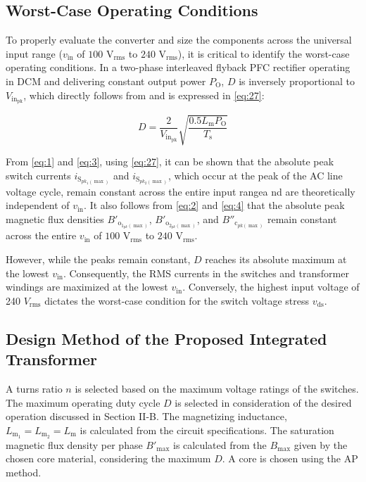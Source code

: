 \documentclass[lettersize,journal]{IEEEtran}
\begin{document}
\subsection{Worst-Case Operating Conditions}
To properly evaluate the converter and size the components across the universal input range ($v_{\text{in}}$ of $100\text{ V}_{\text{rms}}$ to $240\text{ V}_{\text{rms}}$), it is critical to identify the worst-case operating conditions. In a two-phase interleaved flyback PFC rectifier operating in DCM and delivering constant output power $P_{\text{O}}$, $D$ is inversely proportional to $V_{\text{in}_\mathrm{pk}}$, which directly follows from \cite{ref8} and is expressed in \eqref{eq:27}:

\begin{equation}
\label{eq:27}
D = \frac{2}{V_{\mathrm{in}_{\mathrm{pk}}}} \sqrt{\frac{0.5 L_{\mathrm{m}} P_{\mathrm{O}}}{T_{\mathrm{s}}}}
\end{equation}

From \eqref{eq:1} and \eqref{eq:3}, using \eqref{eq:27}, it can be shown that the absolute peak switch currents $i_{\mathrm{S}_{pk_1(\max)}}$ and $i_{\mathrm{S}_{pk_2(\max)}}$, which occur at the peak of the AC line voltage cycle, remain constant across the entire input rangea nd are theoretically independent of $v_{\mathrm{in}}$. It also follows from \eqref{eq:2} and \eqref{eq:4} that the absolute peak magnetic flux densities $B'_{\mathrm{o}_{1_{pk}(\max)}}$, $B'_{\mathrm{o}_{2_{pk}(\max)}}$, and $B''_{\mathrm{c}_{pk(\max)}}$ remain constant across the entire $v_{\text{in}}$ of $100\text{ V}_{\text{rms}}$ to $240\text{ V}_{\text{rms}}$. 

However, while the peaks remain constant, $D$ reaches its absolute maximum at the lowest $v_{\text{in}}$. Consequently, the RMS currents in the switches and transformer windings are maximized at the lowest $v_{\text{in}}$. Conversely, the highest input voltage of 240 $V_\mathrm{rms}$ dictates the worst-case condition for the switch voltage stress $v_{\mathrm{ds}}$.

\subsection{Design Method of the Proposed Integrated Transformer}
A turns ratio $n$ is selected based on the maximum voltage ratings of the switches. The maximum operating duty cycle $D$ is selected in consideration of the desired operation discussed in Section II-B. The magnetizing inductance, $L_{\mathrm{m}_1}=L_{\mathrm{m}_2}=L_{\mathrm{m}}$ is calculated from the circuit specifications. The saturation magnetic flux density per phase $B'_{\mathrm{max}}$ is calculated from the $B_{\mathrm{max}}$ given by the chosen core material, considering the maximum $D$. A core is chosen using the AP method. 
\end{document}
